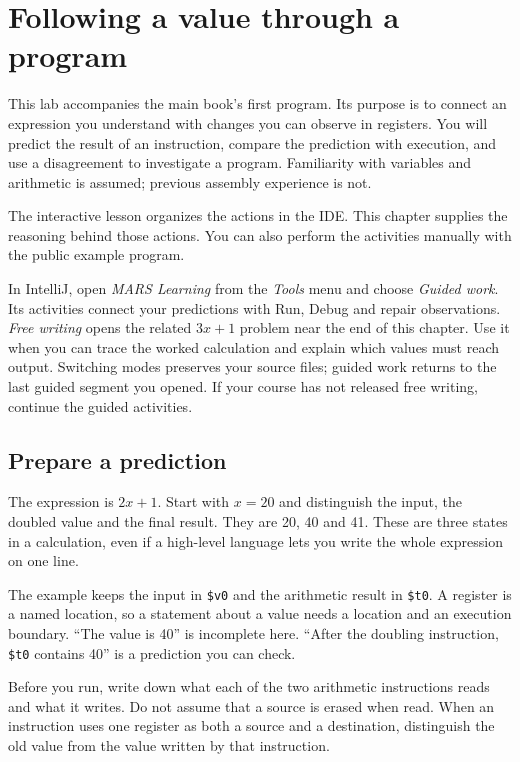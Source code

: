 \chapter{Following a value through a program}
\label{revision:lab-first-program}

This lab accompanies the main book's first program. Its purpose is to connect an
expression you understand with changes you can observe in registers. You will
predict the result of an instruction, compare the prediction with execution, and
use a disagreement to investigate a program. Familiarity with variables and
arithmetic is assumed; previous assembly experience is not.

The interactive lesson organizes the actions in the IDE. This chapter supplies
the reasoning behind those actions. You can also perform the activities manually
with the public example program.

In IntelliJ, open \emph{MARS Learning} from the \emph{Tools} menu and choose
\emph{Guided work}. Its activities connect your predictions with Run, Debug and
repair observations. \emph{Free writing} opens the related $3x+1$ problem near the
end of this chapter. Use it when you can trace the worked calculation and explain
which values must reach output. Switching modes preserves your source files;
guided work returns to the last guided segment you opened. If your course has not
released free writing, continue the guided activities.

\section{Prepare a prediction}

The expression is $2x+1$. Start with $x=20$ and distinguish the input, the doubled
value and the final result. They are 20, 40 and 41. These are three states in a
calculation, even if a high-level language lets you write the whole expression on
one line.

The example keeps the input in \texttt{\$v0} and the arithmetic result in
\texttt{\$t0}. A register is a named location, so a statement about a value needs a
location and an execution boundary. ``The value is 40'' is incomplete here.
``After the doubling instruction, \texttt{\$t0} contains 40'' is a prediction you
can check.

Before you run, write down what each of the two arithmetic instructions reads and
what it writes. Do not assume that a source is erased when read. When an instruction
uses one register as both a source and a destination, distinguish the old value
from the value written by that instruction.

